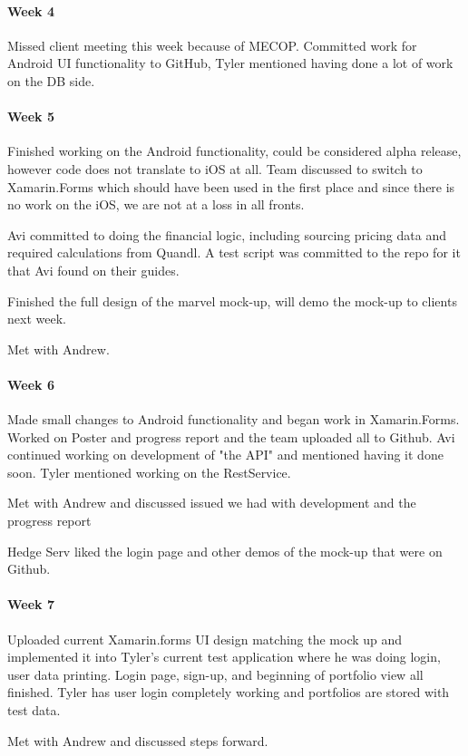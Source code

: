 \documentclass[onecolumn, draftclsnofoot,10pt, compsoc]{IEEEtran}
\begin{document}
\paragraph{Week 4}
    Missed client meeting this week because of MECOP. Committed work for Android UI functionality to GitHub, Tyler mentioned having done 
    a lot of work on the DB side.
\paragraph{Week 5}
    Finished working on the Android functionality, could be considered alpha release, however code does not 
    translate to iOS at all. Team discussed to switch to Xamarin.Forms which should have been used in the first
    place and since there is no work on the iOS, we are not at a loss in all fronts.

    Avi committed to doing the financial logic, including sourcing pricing data and required calculations from
    Quandl. A test script was committed to the repo for it that Avi found on their guides.

    Finished the full design of the marvel mock-up, will demo the mock-up to clients next week.

    Met with Andrew.
\paragraph{Week 6}    
    Made small changes to Android functionality and began work in Xamarin.Forms. Worked on Poster and progress
    report and the team uploaded all to Github. Avi continued working on development of "the API" and mentioned
    having it done soon. Tyler mentioned working on the RestService.
    
    Met with Andrew and discussed issued we had with development and the progress report

    Hedge Serv liked the login page and other demos of the mock-up that were on Github.
\paragraph{Week 7}
    Uploaded current Xamarin.forms UI design matching the mock up and implemented it into Tyler's current test
    application where he was doing login, user data printing. Login page, sign-up, and beginning of portfolio view
    all finished. Tyler has user login completely working and portfolios are stored with test data.

    Met with Andrew and discussed steps forward.
\end{document}
